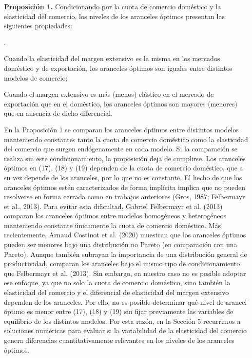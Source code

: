 \documentclass[10pt,a4paper]{article}
\newcounter{numitem}
\newenvironment{lnum}
      {\begin{list}{\arabic{numitem}.}{%
          \usecounter{numitem}%
          \setlength{\leftmargin}{1cm}%
          \setlength{\parskip}{3pt}%
          \setlength{\itemsep}{0pt}%
          \setlength{\parsep}{0pt}%
      }}
      {\end{list}}
\begin{document}
\textbf{Proposición 1.} Condicionando por la cuota de comercio doméstico y la elasticidad del comercio, los niveles de los aranceles óptimos presentan las siguientes propiedades:
\begin{lnum}
    \item Cuando la elasticidad del margen extensivo es la misma en los mercados doméstico y de exportación, los aranceles óptimos son iguales entre distintos modelos de comercio;
    \item Cuando el margen extensivo es más (menos) elástico en el mercado de exportación que en el doméstico, los aranceles óptimos son mayores (menores) que en ausencia de dicho diferencial.
\end{lnum}

En la Proposición 1 se comparan los aranceles óptimos entre distintos modelos manteniendo constantes tanto la cuota de comercio doméstico como la elasticidad del comercio que surgen endógenamente en cada modelo. Si la comparación se realiza sin este condicionamiento, la proposición deja de cumplirse. Los aranceles óptimos en (17), (18) y (19) dependen de la cuota de comercio doméstico, que a su vez depende de los aranceles, por lo que no es constante. El hecho de que los aranceles óptimos estén caracterizados de forma implícita implica que no pueden resolverse en forma cerrada como en trabajos anteriores (Gros, 1987; Felbermayr et al., 2013). Para evitar esta dificultad, Gabriel Felbermayr et al. (2013) comparan los aranceles óptimos entre modelos homogéneos y heterogéneos manteniendo constante únicamente la cuota de comercio doméstico. Más recientemente, Arnaud Costinot et al. (2020) muestran que los aranceles óptimos pueden ser menores bajo una distribución no Pareto (en comparación con una Pareto). Aunque también subrayan la importancia de una distribución general de productividad, comparan los aranceles bajo el mismo tipo de condicionamiento que Felbermayr et al. (2013). Sin embargo, en nuestro caso no es posible adoptar ese enfoque, ya que no solo la cuota de comercio doméstico, sino también la elasticidad del comercio y el diferencial de elasticidad del margen extensivo dependen de los aranceles. Por ello, no es posible determinar qué nivel de arancel óptimo es menor entre (17), (18) y (19) sin fijar previamente las variables de equilibrio de los distintos modelos. Por esta razón, en la Sección 5 recurrimos a soluciones numéricas para evaluar si la variabilidad de la elasticidad del comercio genera diferencias cuantitativamente relevantes en los niveles de los aranceles óptimos.
\end{document}
